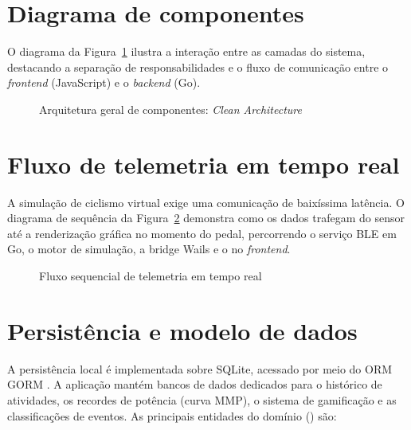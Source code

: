 \section{Diagrama de componentes}
\label{sec:diagrama-arquitetura}

O diagrama da Figura~\ref{fig:arquitetura} ilustra a interação entre as camadas
do sistema, destacando a separação de responsabilidades e o fluxo de
comunicação entre o \textit{frontend} (JavaScript) e o \textit{backend} (Go).

\begin{figure}[htbp]
    \centering
    \caption{Arquitetura geral de componentes: \textit{Clean Architecture}}
    \label{fig:arquitetura}
    
\end{figure}

\section{Fluxo de telemetria em tempo real}
\label{sec:diagrama-telemetria}

A simulação de ciclismo virtual exige uma comunicação de baixíssima latência. O
diagrama de sequência da Figura~\ref{fig:telemetria} demonstra como os dados
trafegam do sensor até a renderização gráfica no momento do pedal, percorrendo
o serviço BLE em Go, o motor de simulação, a bridge Wails e o
 no \textit{frontend}.

\begin{figure}[htbp]
    \centering
    \caption{Fluxo sequencial de telemetria em tempo real}
    \label{fig:telemetria}
    
\end{figure}

\section{Persistência e modelo de dados}
\label{sec:persistencia}

A persistência local é implementada sobre SQLite, acessado por meio do ORM
GORM \cite{gorm2024}. A aplicação mantém bancos de dados dedicados para o
histórico de atividades, os recordes de potência (curva MMP), o sistema de
gamificação e as classificações de eventos. As principais entidades do domínio
() são:


